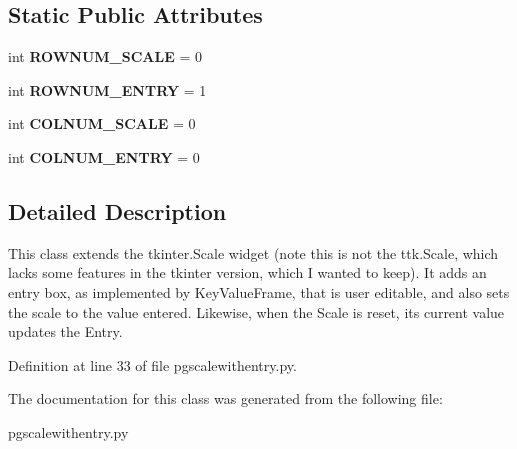 \subsection*{Static Public Attributes}
\begin{DoxyCompactItemize}
\item 
int {\bfseries R\+O\+W\+N\+U\+M\+\_\+\+S\+C\+A\+LE} = 0\hypertarget{classnegui_1_1pgscalewithentry_1_1PGScaleWithEntry_afe9640837576d3504a30905a6a949fbe}{}\label{classnegui_1_1pgscalewithentry_1_1PGScaleWithEntry_afe9640837576d3504a30905a6a949fbe}

\item 
int {\bfseries R\+O\+W\+N\+U\+M\+\_\+\+E\+N\+T\+RY} = 1\hypertarget{classnegui_1_1pgscalewithentry_1_1PGScaleWithEntry_a22d6f32981ffa9f9c86dbb31da9ca394}{}\label{classnegui_1_1pgscalewithentry_1_1PGScaleWithEntry_a22d6f32981ffa9f9c86dbb31da9ca394}

\item 
int {\bfseries C\+O\+L\+N\+U\+M\+\_\+\+S\+C\+A\+LE} = 0\hypertarget{classnegui_1_1pgscalewithentry_1_1PGScaleWithEntry_a7fbf56a0701330560e55c99328226676}{}\label{classnegui_1_1pgscalewithentry_1_1PGScaleWithEntry_a7fbf56a0701330560e55c99328226676}

\item 
int {\bfseries C\+O\+L\+N\+U\+M\+\_\+\+E\+N\+T\+RY} = 0\hypertarget{classnegui_1_1pgscalewithentry_1_1PGScaleWithEntry_ab84d29962935029b8c3ebff65c75e5db}{}\label{classnegui_1_1pgscalewithentry_1_1PGScaleWithEntry_ab84d29962935029b8c3ebff65c75e5db}

\end{DoxyCompactItemize}


\subsection{Detailed Description}
\begin{DoxyVerb}This class extends the tkinter.Scale widget (note
this is not the ttk.Scale, which lacks some features
in the tkinter version, which I wanted to keep).  It
adds an entry box, as implemented by KeyValueFrame, 
that is user editable, and also sets the scale to 
the value entered.  Likewise, when the Scale is reset,
its current value updates the Entry.
\end{DoxyVerb}
 

Definition at line 33 of file pgscalewithentry.\+py.



The documentation for this class was generated from the following file\+:\begin{DoxyCompactItemize}
\item 
pgscalewithentry.\+py\end{DoxyCompactItemize}
